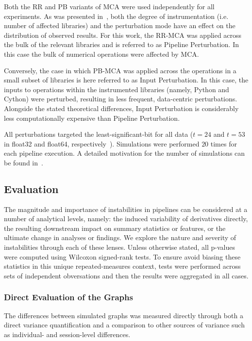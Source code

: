 \documentclass[fleqn,10pt]{SelfArx} %
\newcommand{\new}[1]{{\color{blue} #1}}
\begin{document}
Both the RR and PB variants of MCA were used independently for all experiments. As was presented in~\cite{Kiar2020-lb},
both the degree of instrumentation (i.e. number of affected libraries) and the perturbation mode have an effect on the
distribution of observed results. For this work, the RR-MCA was applied across the bulk of the relevant libraries and
is referred to as Pipeline Perturbation. In this case the bulk of numerical operations were affected by MCA.

Conversely, the case in which PB-MCA was applied across the operations in a small subset of libraries is here referred
to as Input Perturbation. In this case, the inputs to operations within the instrumented libraries (namely, Python and
Cython) were perturbed, resulting in less frequent, data-centric perturbations. Alongside the stated theoretical
differences, Input Perturbation is considerably less computationally expensive than Pipeline Perturbation.

All perturbations targeted the least-significant-bit for all data ($t=24$ and $t=53$ in float32 and float64,
respectively~\cite{Denis2016-wo}). Simulations were performed $20$ times for each pipeline execution. A detailed
motivation for the number of simulations can be found in~\cite{Sohier2018-ts}.

\subsection*{Evaluation}

The magnitude and importance of instabilities in pipelines can be considered at a number of analytical levels, namely:
the induced variability of derivatives directly, the resulting downstream impact on summary statistics or features, or
the ultimate change in analyses or findings. We explore the nature and severity of instabilities through each of these
lenses. Unless otherwise stated, all p-values were computed using Wilcoxon signed-rank tests. \new{To ensure
avoid biasing these statistics in this unique repeated-measures context, tests were performed across sets of independent
obversations and then the results were aggregated in all cases.}

\subsubsection*{Direct Evaluation of the Graphs}

The differences between simulated graphs was measured directly through both a direct variance quantification and a
comparison to other sources of variance such as individual- and session-level differences.
\end{document}
